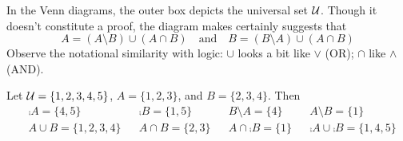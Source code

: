 
In the Venn diagrams, the outer box depicts the universal set $\mathcal{U}$. Though it doesn't constitute a proof, the diagram makes certainly suggests that
\[
	A=(A\setminus B)\cup (A\cap B) \quad\text{and}\quad B=(B\setminus A)\cup(A\cap B)
\]
Observe the notational similarity with logic: $\cup$ looks a bit like $\vee$ (OR); $\cap$ like $\wedge$ (AND).

\begin{examples}{}{}
	\exstart Let $\mathcal{U}=\{1,2,3,4,5\}$, $A=\{1,2,3\}$, and $B=\{2,3,4\}$. Then
	\begin{align*}
		&\comp A=\{4,5\} &&\comp B=\{1,5\} &&B\setminus A=\{4\} &&A\setminus B=\{1\}\\
		&A\cup B=\{1,2,3,4\} &&A\cap B=\{2,3\} &&A\cap\comp B=\{1\} &&\comp A\cup\comp B=\{1,4,5\}
	\end{align*}
	
	\goodbreak
		

\end{examples}
